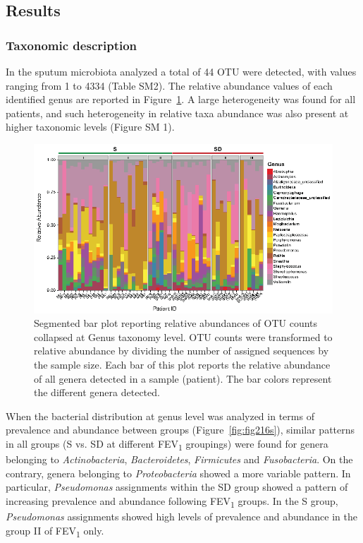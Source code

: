 \subsection{Results}
\subsubsection{Taxonomic description}
In the sputum microbiota analyzed a total of 44 OTU were detected, with values ranging from 1 to 4334 (Table SM2). The relative abundance values of each identified genus are reported in Figure~\ref{fig:fig116s}. A large heterogeneity was found for all patients, and such heterogeneity in relative taxa abundance was also present at higher taxonomic levels (Figure SM 1).\\
\begin{figure}[!tb]
	\centering
	\includegraphics[width=1\textwidth]{./figures/Chapter_7/Figure_1_16s}
  	\caption{\label{fig:fig116s}Segmented bar plot reporting relative abundances of OTU counts collapsed at Genus taxonomy level. OTU counts were transformed to relative abundance by dividing the number of assigned sequences by the sample size. Each bar of this plot reports the relative abundance of all genera detected in a sample (patient). The bar colors represent the different genera detected.}
\end{figure}
When the bacterial distribution at genus level was analyzed in terms of prevalence and abundance between groups (Figure~\ref{fig:fig216s}), similar patterns in all groups (S vs. SD at different FEV\textsubscript{1} groupings) were found for genera belonging to \textit{Actinobacteria}, \textit{Bacteroidetes}, \textit{Firmicutes} and \textit{Fusobacteria}. On the contrary, genera belonging to \textit{Proteobacteria }showed a more variable pattern. In particular, \textit{Pseudomonas} assignments within the SD group showed a pattern of increasing prevalence and abundance following FEV\textsubscript{1} groups. In the S group, \textit{Pseudomonas} assignments showed high levels of prevalence and abundance in the group II of FEV\textsubscript{1} only.\\ 
